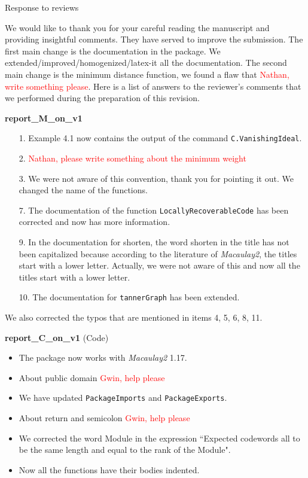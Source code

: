 \documentclass[12pt]{amsart}
\theoremstyle{plain}
\begin{document}
\begin{center}
Response to reviews
\end{center}
We would like to thank you for your careful reading the manuscript and providing insightful comments. They have served to improve the submission. The first main change is the documentation in the package. We extended/improved/homogenized/latex-it all the documentation. The second main change is the minimum distance function, we found a flaw that \textcolor{red}{Nathan, write something please}. Here is a list of answers to the reviewer's comments that we performed during the preparation of this revision.
\begin{center}
{\bf report\_M\_on\_v1}
\end{center}
\begin{itemize}
\item[\rm 1.] Example 4.1 now contains the output of the command {\tt C.VanishingIdeal}.
\item[\rm 2.] \textcolor{red}{Nathan, please write something about the minimum weight}
\item[\rm 3.] We were not aware of this convention, thank you for pointing it out. We changed the name of the functions.
\item[\rm 7.] The documentation of the function {\tt LocallyRecoverableCode} has been corrected and now has more information.
\item[\rm 9.] In the documentation for shorten, the word shorten in the title has not been capitalized because according to the literature of {\it Macaulay2}, the titles start with a lower letter. Actually, we were not aware of this and now all the titles start with a lower letter.
\item[\rm 10.] The documentation for {\tt tannerGraph} has been extended.
\end{itemize}
We also corrected the typos that are mentioned in items 4, 5, 6, 8, 11.
\begin{center}
{\bf report\_C\_on\_v1} (Code)
\end{center}
\begin{itemize}
\item The package now works with {\it Macaulay2} 1.17.
\item About public domain \textcolor{red}{Gwin, help please}
\item We have updated {\tt PackageImports} and {\tt PackageExports}.
\item About return and semicolon \textcolor{red}{Gwin, help please}
\item We corrected the word Module in the expression ``Expected codewords all to be the same length and equal to the rank of the Module".
\item Now all the functions have their bodies indented.
\end{itemize}
\end{document}

